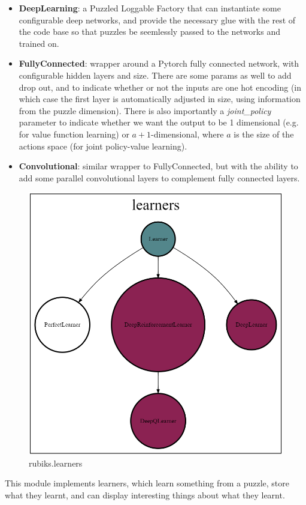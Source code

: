 \begin{itemize}
\item \textbf{DeepLearning}: a Puzzled Loggable Factory that can instantiate some configurable deep networks, and provide the necessary glue with the rest of the code base so that puzzles be seemlessly passed to the networks and trained on. 
\item \textbf{FullyConnected}: wrapper around a Pytorch fully connected network, with configurable hidden layers and size. There are some params as well to add drop out, and to indicate whether or not the inputs are one hot encoding (in which case the first layer is automatically adjusted in size, using information from the puzzle dimension). There is also importantly a \textit{joint\_policy} parameter to indicate whether we want the output to be 1 dimensional (e.g. for value function learning) or $a+1$-dimensional, where $a$ is the size of the actions space (for joint policy-value learning).
\item \textbf{Convolutional}: similar wrapper to FullyConnected, but with the ability to add some parallel convolutional layers to complement fully connected layers.
\end{itemize}


\label{sec:codelearners}
\begin{figure}[H]
\centering
\includegraphics[scale=0.25]{./Figures/codebaselearners}
\caption[Codebase]{rubiks.learners}
\label{fig:Codebaselearners}
\end{figure}
\label{PLcode}
\label{DRLcode}
\label{DQLcode}
This module implements learners, which learn something from a puzzle, store what they learnt, and can display interesting things about what they learnt.

